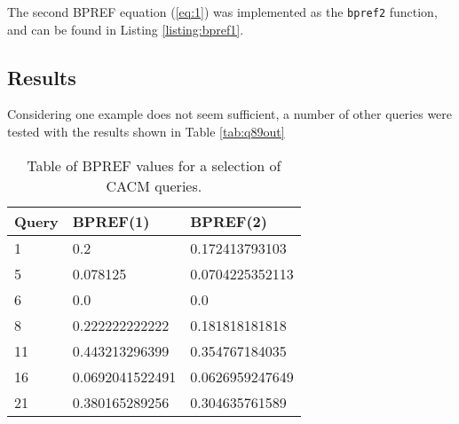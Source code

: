 \clearpage



The second BPREF equation (\ref{eq:1}) was implemented as the \texttt{bpref2} function, and can be found in Listing \ref{listing:bpref1}.




\subsection{Results}
Considering one example does not seem sufficient, a number of other queries were tested with the results shown in Table \ref{tab:q89out}

\begin{table}[H]
\centering
\begin{tabular}{ | l | l | l | }
\hline
Query & BPREF(1) & BPREF(2) \\
\hline
1 & 0.2 & 0.172413793103\\
\hline
5 & 0.078125 & 0.0704225352113\\
\hline
6 & 0.0 & 0.0\\
\hline
8 & 0.222222222222 & 0.181818181818\\
\hline
11 & 0.443213296399 & 0.354767184035\\
\hline
16 & 0.0692041522491 & 0.0626959247649\\
\hline
21 & 0.380165289256 & 0.304635761589\\
\hline
\end{tabular}
\caption{Table of BPREF values for a selection of CACM queries.}
\label{tab:bpref}
\end{table}
